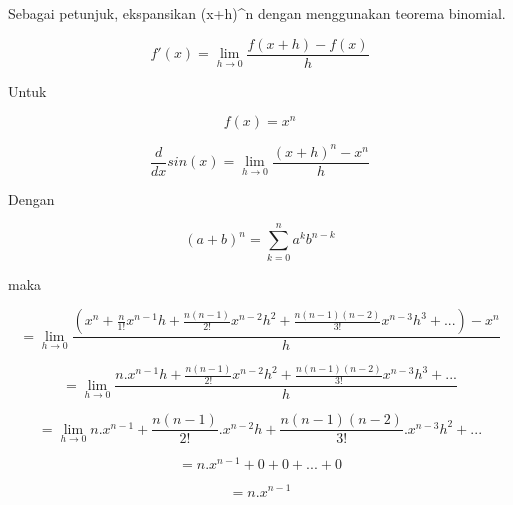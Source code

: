 \documentclass[12pt,arial,letterpaper]{book}
\begin{document}
\begin{eulercomment}
\begin{eulercomment}
\begin{eulercomment}
\begin{eulercomment}
\begin{eulercomment}
\begin{eulercomment}
\begin{eulercomment}
\begin{eulercomment}
\begin{eulercomment}
\begin{eulercomment}
\begin{eulercomment}
\begin{eulercomment}
\begin{eulercomment}
\begin{eulercomment}
\begin{eulercomment}
\begin{eulercomment}
\begin{eulercomment}
\begin{eulercomment}
\begin{eulercomment}
\begin{eulercomment}
\begin{eulercomment}
\begin{eulercomment}
\begin{eulercomment}
Sebagai petunjuk, ekspansikan (x+h)\textasciicircum{}n dengan menggunakan teorema
binomial.

\end{eulercomment}
\begin{eulercomment}
\end{eulercomment}
\begin{eulerformula}
\[
f'(x) = \lim_{h\to 0} \frac{f(x+h)-f(x)}{h}
\]
\end{eulerformula}
\begin{eulercomment}
Untuk\\
\end{eulercomment}
\begin{eulerformula}
\[
f(x)=x^{n}
\]
\end{eulerformula}
\begin{eulerformula}
\[
\frac{d}{dx}sin(x) = \lim_{h\to 0} \frac{(x+h)^{n}-x^{n}}{h}
\]
\end{eulerformula}
\begin{eulercomment}
Dengan\\
\end{eulercomment}
\begin{eulerformula}
\[
(a+b)^{n}=\sum_{k=0}^n a^{k}b^{n-k}
\]
\end{eulerformula}
\begin{eulercomment}
maka\\
\end{eulercomment}
\begin{eulerformula}
\[
= \lim_{h\to 0} \frac{(x^{n}+\frac{n}{1!}x^{n-1}h+\frac{n(n-1)}{2!}x^{n-2}h^2+\frac{n(n-1)(n-2)}{3!}x^{n-3}h^{3}+...)-x^{n}}{h}
\]
\end{eulerformula}
\begin{eulerformula}
\[
= \lim_{h\to 0} \frac{n.x^{n-1}h+\frac{n(n-1)}{2!}x^{n-2}h^2+\frac{n(n-1)(n-2)}{3!}x^{n-3}h^{3}+...}{h}
\]
\end{eulerformula}
\begin{eulerformula}
\[
= \lim_{h\to 0} n.x^{n-1}+\frac{n(n-1)}{2!}.x^{n-2}h+\frac{n(n-1)(n-2)}{3!}.x^{n-3}h^{2}+...
\]
\end{eulerformula}
\begin{eulerformula}
\[
= n.x^{n-1}+0+0+...+0
\]
\end{eulerformula}
\begin{eulerformula}
\[
= n.x^{n-1}
\]
\end{eulerformula}

\end{eulercomment}
\end{eulercomment}
\end{eulercomment}
\end{eulercomment}
\end{eulercomment}
\end{eulercomment}
\end{eulercomment}
\end{eulercomment}
\end{eulercomment}
\end{eulercomment}
\end{eulercomment}
\end{eulercomment}
\end{eulercomment}
\end{eulercomment}
\end{eulercomment}
\end{eulercomment}
\end{eulercomment}
\end{eulercomment}
\end{eulercomment}
\end{eulercomment}
\end{eulercomment}
\end{eulercomment}
\end{document}
